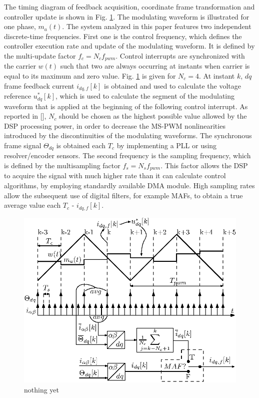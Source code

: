 \documentclass[journal]{IEEEtran}
\begin{document}
The timing diagram of feedback acquisition, coordinate frame transformation and controller update is shown in Fig. \ref{fig:timings}. The modulating waveform is illustrated for one phase, $m_a(t)$.
The system analyzed in this paper features two independent discrete-time frequencies. First one is the control frequency, which defines the controller execution rate and update of the modulating waveform. It is defined by the multi-update factor $f_c = N_c f_{pwm}$. Control interrupts are synchronized with the carrier $w(t)$ such that two are always occurring at instants when carrier is equal to its maximum and zero value. Fig. \ref{fig:timings} is given for $N_c = 4$. At instant $k$, $dq$ frame feedback current $i_{dq,f}[k]$ is obtained and used to calculate the voltage reference $u^*_{dq}[k]$, which is used to calculate the segment of the modulating waveform that is applied at the beginning of the following control interrupt. As reported in [], $N_c$ should be chosen as the highest possible value allowed by the DSP processing power, in order to decrease the MS-PWM nonlinearities introduced by the discontinuities of the modulating waveforms. The synchronous frame signal $\Theta_{dq}$ is obtained each $T_c$ by implementing a PLL or using resolver/encoder sensors. 
The second frequency is the sampling frequency, which is defined by the multisampling factor $f_s = N_s f_{pwm}$. This factor allows the DSP to acquire the signal with much higher rate than it can calculate control algorithms, by employing standardly available DMA module. High sampling rates allow the subsequent use of digital filters, for example MAFs, to obtain a true average value each $T_c$ - $i_{dq,f}[k]$.


\begin{figure}[t!]
    \centerline{\includegraphics[width=0.95\linewidth]{figures/timing_diagram.eps}}
    \caption{nothing yet}
    \label{fig:timings}
\end{figure}
\end{document}
